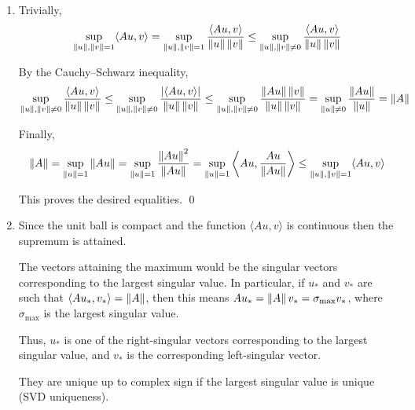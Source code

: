 \documentclass[10pt]{article}
\begin{document}
\begin{solution}[Solution]
\begin{enumerate}[label=(\alph*)]
    \item

    Trivially,
    \begin{align*}
        \sup_{\left\lVert u\right\rVert, \left\lVert v\right\rVert = 1} \langle Au,v \rangle
        = \sup_{\left\lVert u\right\rVert, \left\lVert v\right\rVert = 1} \dfrac{ \langle Au,v \rangle}{ \left\lVert u\right\rVert\left\lVert v\right\rVert}
        \leq \sup_{\left\lVert u\right\rVert, \left\lVert v\right\rVert \neq 0} \dfrac{ \langle Au,v \rangle}{ \left\lVert u\right\rVert\left\lVert v\right\rVert}
    \end{align*}

    By the Cauchy--Schwarz inequality,
    \begin{align*}
        \sup_{\left\lVert u\right\rVert, \left\lVert v\right\rVert \neq 0} \dfrac{ \langle Au,v \rangle}{ \left\lVert u\right\rVert\left\lVert v\right\rVert}
        \leq \sup_{\left\lVert u\right\rVert, \left\lVert v\right\rVert \neq 0} \dfrac{ |\langle Au,v \rangle|}{ \left\lVert u\right\rVert\left\lVert v\right\rVert}
        \leq \sup_{\left\lVert u\right\rVert, \left\lVert v\right\rVert \neq 0} \dfrac{ \left\lVert Au\right\rVert\left\lVert v\right\rVert}{ \left\lVert u\right\rVert\left\lVert v\right\rVert}
        = \sup_{\left\lVert u\right\rVert \neq 0} \dfrac{ \left\lVert Au\right\rVert}{ \left\lVert u\right\rVert}
        = \left\lVert A\right\rVert
    \end{align*}

    Finally,
    \begin{align*}
        \left\lVert A\right\rVert = \sup_{\left\lVert u\right\rVert = 1} \left\lVert Au\right\rVert
        = \sup_{\left\lVert u\right\rVert = 1} \dfrac{\left\lVert Au\right\rVert^2}{\left\lVert Au\right\rVert}
        = \sup_{\left\lVert u\right\rVert = 1} \left\langle Au, \dfrac{Au}{\left\lVert Au\right\rVert} \right\rangle
        \leq \sup_{\left\lVert u\right\rVert,\left\lVert v\right\rVert = 1} \langle Au, v\rangle
    \end{align*}

    This proves the desired equalities. \qed


    \item Since the unit ball is compact and the function \( \langle Au,v\rangle \) is continuous then the supremum is attained.

    The vectors attaining the maximum would be the singular vectors corresponding to the largest singular value. In particular, if \( u_* \) and \( v_* \) are such that \( \langle A u_*, v_* \rangle  = \left\lVert A\right\rVert \), then this means \( Au_* = \left\lVert A\right\rVert v_* = \sigma_{\text{max}} v_*  \), where \( \sigma_\text{max} \) is the largest singular value.

    Thus, \( u_* \) is one of the right-singular vectors corresponding to the largest singular value, and \( v_* \) is the corresponding left-singular vector.

    They are unique up to complex sign if the largest singular value is unique (SVD uniqueness).

\end{enumerate}
\end{solution}
\end{document}
